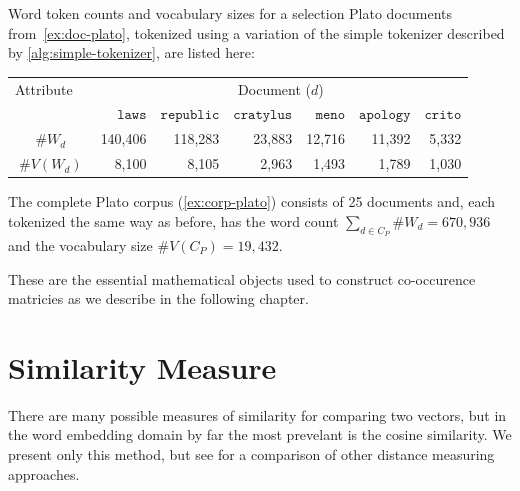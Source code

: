 \begin{example}
  Word token counts and vocabulary sizes for a selection Plato documents from~\ref{ex:doc-plato}, tokenized using a variation of the simple tokenizer described by \autoref{alg:simple-tokenizer}\footnotemark, are listed here:\\[-1em]
  \begin{center}
  \captionsetup{width=.91\linewidth}
    \begin{tabular}{c r r r r r r}
      \toprule
      \multicolumn{1}{c}{Attribute$\quad$} &
      \multicolumn{6}{c}{Document ($d$)} \\

      \cmidrule(lr){2-7}
      &
      $\texttt{laws}$ &
      $\texttt{republic}$ &
      $\texttt{cratylus}$ &
      $\texttt{meno}$ &
      $\texttt{apology}$ &
      $\texttt{crito}$ \\
      \midrule
      $\#W_d$ & 140,406 & 118,283 & 23,883 & 12,716 & 11,392 & 5,332\\
      $\#V(W_d)$ & 8,100 & 8,105 & 2,963 & 1,493 & 1,789 & 1,030\\
      \bottomrule
    \end{tabular}
    \end{center}
\end{example}

\begin{example}
  The complete Plato corpus (\ref{ex:corp-plato}) consists of 25 documents and, each tokenized the same way as before, has the word count $\sum_{d\in C_P}\#W_d=670,936$ and the vocabulary size $\#V(C_P)=19,432$.
\end{example}

These are the essential mathematical objects used to construct co-occurence matricies as we describe in the following chapter.

\section{Similarity Measure}
There are many possible measures of similarity for comparing two vectors, but in the word embedding domain by far the most prevelant is the cosine similarity. We present only this method, but see \parencite{bullinaria-2007-extracting-semantic} for a comparison of other distance measuring approaches.

